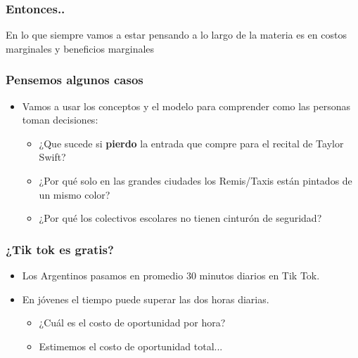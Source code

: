 \documentclass{beamer}
\begin{document}
\begin{frame}
\frametitle{Entonces.. }
    \begin{boxA}
        En lo que siempre vamos a estar pensando a lo largo de la materia es en costos marginales y beneficios marginales    
    \end{boxA}
\end{frame}
\begin{frame}
\frametitle{Pensemos algunos casos}
\begin{itemize}
    \item Vamos a usar los conceptos y el modelo para comprender como las personas toman decisiones: \vspace{2mm}
    \begin{itemize} 
    \item ¿Que sucede si \textbf{pierdo} la entrada que compre para el recital de Taylor Swift? \vspace{2mm}
    \item ¿Por qué solo en las grandes ciudades los Remis/Taxis están pintados de un mismo color? \vspace{2mm}
    \item ¿Por qué los colectivos escolares no tienen cinturón de seguridad? 
    \end{itemize}
\end{itemize} 
\end{frame}

\begin{frame}
\frametitle{¿Tik tok es gratis?}
\begin{itemize}
    \item Los Argentinos pasamos en promedio 30 minutos diarios en Tik Tok. \vspace{2mm}
    \item En jóvenes el tiempo puede superar las dos horas diarias. \vspace{2mm}
    \begin{itemize}
    \item ¿Cuál es el costo de oportunidad por hora? \vspace{2mm}
    \item Estimemos el costo de oportunidad total...
    \end{itemize}
\end{itemize} 
\end{frame}
\end{document}
